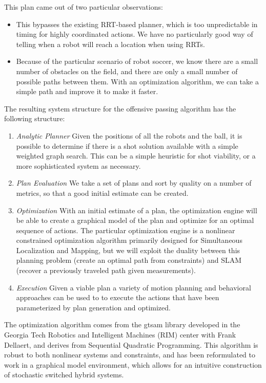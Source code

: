 \documentclass[a4paper, 10pt, conference]{ieeeconf}      %
\begin{document}
This plan came out of two particular observations:

\begin{itemize}
 \item This bypasses the existing RRT-based planner, which is too unpredictable in timing for highly coordinated actions. We have no particularly good way of telling when a robot will reach a location when using RRTs.
 \item Because of the particular scenario of robot soccer, we know there are a small number of obstacles on the field, and there are only a small number of possible paths between them. With an optimization algorithm, we can take a simple path and improve it to make it faster.
\end{itemize}

The resulting system structure for the offensive passing algorithm has the following structure:
\begin{enumerate}
 \item \textit{Analytic Planner} Given the positions of all the robots and the ball, it is possible to determine if there is a shot solution available with a simple weighted graph search. This can be a simple heuristic for shot viability, or a more sophisticated system as necessary.
 \item \textit{Plan Evaluation} We take a set of plans and sort by quality on a number of metrics, so that a good initial estimate can be created.
 \item \textit{Optimization} With an initial estimate of a plan, the optimization engine will be able to create a graphical model of the plan and optimize for an optimal sequence of actions. The particular optimization engine is a nonlinear constrained optimization algorithm primarily designed for Simultaneous Localization and Mapping, but we will exploit the duality between this planning problem (create an optimal path from constraints) and SLAM (recover a previously traveled path given measurements).
 \item \textit{Execution} Given a viable plan a variety of motion planning and behavioral approaches can be used to to execute the actions that have been parameterized by plan generation and optimized.  
\end{enumerate}

The optimization algorithm comes from the gtsam library\cite{Dellaert05rss} developed in the Georgia Tech Robotics and Intelligent Machines (RIM) center with Frank Dellaert, and derives from Sequential Quadratic Programming. This algorithm is robust to both nonlinear systems and constraints, and has been reformulated to work in a graphical model environment, which allows for an intuitive construction of stochastic switched hybrid systems.
\end{document}
